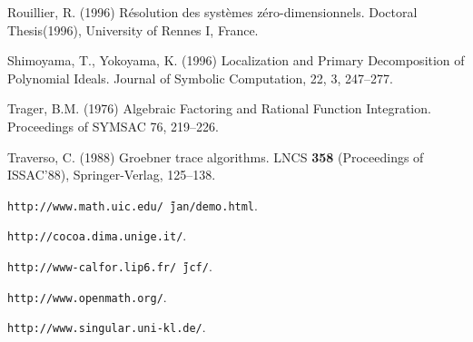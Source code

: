 \documentclass[runningheads]{cl2emult}
\begin{document}
\begin{thebibliography}{7}
Rouillier, R. (1996)
R\'esolution des syst\`emes z\'ero-dimensionnels. 
Doctoral Thesis(1996), University of Rennes I, France.

Shimoyama, T., Yokoyama, K. (1996)
Localization and Primary Decomposition of Polynomial Ideals.
Journal of Symbolic Computation, 22, 3, 247--277.

Trager, B.M. (1976)
Algebraic Factoring and Rational Function Integration.
Proceedings of SYMSAC 76, 219--226.

Traverso, C. (1988)
Groebner trace algorithms.
LNCS {\bf 358} (Proceedings of ISSAC'88), Springer-Verlag, 125--138.

{\tt http://www.math.uic.edu/\~\,jan/demo.html}.

{\tt http://cocoa.dima.unige.it/}.

{\tt http://www-calfor.lip6.fr/\~\,jcf/}.


{\tt http://www.openmath.org/}.

{\tt http://www.singular.uni-kl.de/}.

\end{thebibliography}

\clearpage
{}
\flushbottom
\printindex
\end{document}
